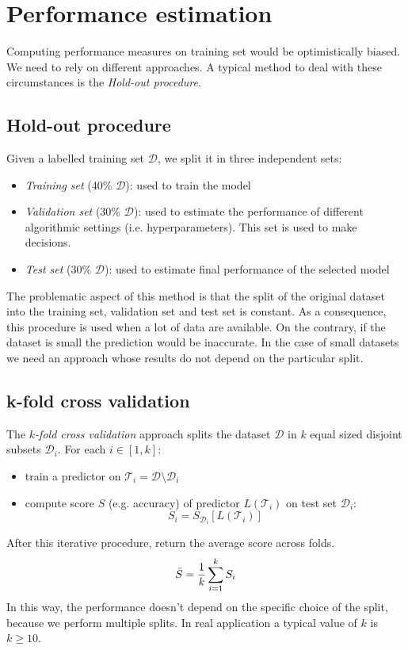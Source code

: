\section{Performance estimation}
Computing performance measures on training set would be optimistically biased.
We need to rely on different approaches. A typical method to deal with these circumstances
is the \textit{Hold-out procedure}.

\subsection{Hold-out procedure}
Given a labelled training set $\mathcal{D}$, we split it in three independent sets:
\begin{itemize}
	\item \textit{Training set} (40\% $\mathcal{D}$): used to train the model

	\item \textit{Validation set} (30\% $\mathcal{D}$): used to estimate the
		performance of different algorithmic settings (i.e. hyperparameters). This
		set is used to make decisions.

	\item \textit{Test set} (30\% $\mathcal{D}$): used to estimate final
		performance of the selected model
\end{itemize}

The problematic aspect of this method is that the split of the original dataset into
the training set, validation set and test set is constant. As a consequence,
this procedure is used when a lot of data are available. On the contrary, if the
dataset is small the prediction would be inaccurate. In the case of small datasets
we need an approach whose results do not depend on the particular split.

\subsection{k-fold cross validation}
The \textit{$k$-fold cross validation} approach splits the dataset $\mathcal{D}$
in $k$ equal sized disjoint subsets $\mathcal{D}_{i}$. For each $i \in [1,k]$:
\begin{itemize}
	\item train a predictor on $\mathcal{T}_{i}= \mathcal{D}\setminus \mathcal{D}_{i}$

	\item compute score $S$ (e.g. accuracy) of predictor $L(\mathcal{T}_{i})$ on
		test set $\mathcal{D}_{i}$:
		\[
			S_{i}= S_{\mathcal{D}_i}[L(\mathcal{T}_{i})]
		\]
\end{itemize}
After this iterative procedure, return the average score across folds.
\[
	\Bar{S}= \frac{1}{k}\sum_{i=1}^{k}S_{i}
\]
In this way, the performance doesn't depend on the specific choice of the split,
because we perform multiple splits. In real application a typical value of $k$ is
$k \geq 10$.
\newline

